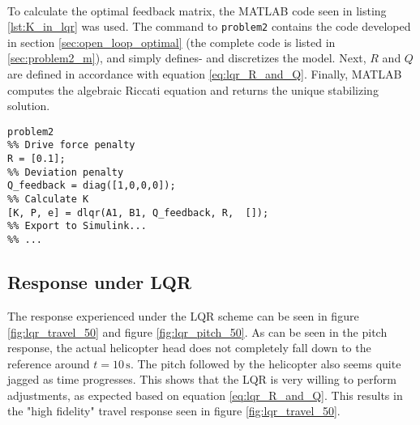 \\
To calculate the optimal feedback matrix, the MATLAB code seen in listing \ref{lst:K_in_lqr} was used. The command to \lstinline!problem2! contains the code developed in section \ref{sec:open_loop_optimal} (the complete code is listed in \cref{sec:problem2_m}), and simply defines- and discretizes the model. Next, $R$ and $Q$ are defined in accordance with equation \ref{eq:lqr_R_and_Q}. Finally, MATLAB computes the algebraic Riccati equation and returns the unique stabilizing solution.
\begin{lstlisting}[caption=Computation of the optimal feedback matrix K.,label=lst:K_in_lqr]
%% Initialization and model definition
problem2
%% Drive force penalty
R = [0.1];
%% Deviation penalty
Q_feedback = diag([1,0,0,0]);
%% Calculate K
[K, P, e] = dlqr(A1, B1, Q_feedback, R,  []);
%% Export to Simulink...
%% ...
\end{lstlisting}
\subsection{Response under LQR}
The response experienced under the LQR scheme can be seen in figure \ref{fig:lqr_travel_50} and figure \ref{fig:lqr_pitch_50}. As can be seen in the pitch response, the actual helicopter head does not completely fall down to the reference around $t = 10\,\mathrm{s}$. The pitch followed by the helicopter also seems quite jagged as time progresses. This shows that the LQR is very willing to perform adjustments, as expected based on equation \ref{eq:lqr_R_and_Q}. This results in the "high fidelity" travel response seen in figure \ref{fig:lqr_travel_50}.\\
\\
